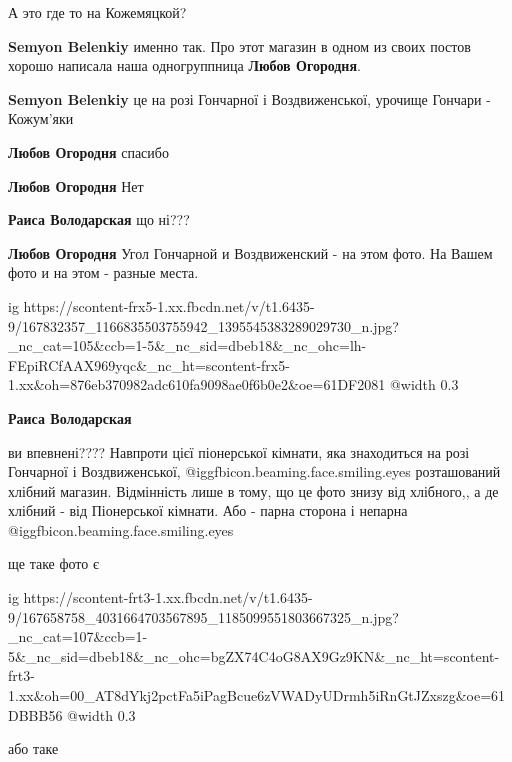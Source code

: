  
 
 
 
 

А это где то на Кожемяцкой?

\textbf{Semyon Belenkiy} именно так. Про этот магазин в одном из своих постов хорошо написала наша одногруппница \textbf{Любов Огородня}.

\textbf{Semyon Belenkiy} це на розі Гончарної і Воздвиженської, урочище Гончари - Кожум'яки

\textbf{Любов Огородня} спасибо

\textbf{Любов Огородня} Нет

\textbf{Раиса Володарская} що ні???

\textbf{Любов Огородня} Угол Гончарной и Воздвиженский - на этом фото. На Вашем фото и на этом - разные места.

\ifcmt
  ig https://scontent-frx5-1.xx.fbcdn.net/v/t1.6435-9/167832357_1166835503755942_1395545383289029730_n.jpg?_nc_cat=105&ccb=1-5&_nc_sid=dbeb18&_nc_ohc=lh-FEpiRCfAAX969yqc&_nc_ht=scontent-frx5-1.xx&oh=876eb370982adc610fa9098ae0f6b0e2&oe=61DF2081
  @width 0.3
\fi

\textbf{Раиса Володарская} 

ви впевнені???? Навпроти цієї піонерської кімнати, яка знаходиться на розі
Гончарної і Воздвиженської,  @igg{fbicon.beaming.face.smiling.eyes}  розташований хлібний магазин. Відмінність лише в
тому, що це фото знизу від хлібного,, а де хлібний - від Піонерської кімнати.
Або - парна сторона і непарна @igg{fbicon.beaming.face.smiling.eyes} 

ще таке фото є

\ifcmt
  ig https://scontent-frt3-1.xx.fbcdn.net/v/t1.6435-9/167658758_4031664703567895_1185099551803667325_n.jpg?_nc_cat=107&ccb=1-5&_nc_sid=dbeb18&_nc_ohc=bgZX74C4oG8AX9Gz9KN&_nc_ht=scontent-frt3-1.xx&oh=00_AT8dYkj2pctFa5iPagBcue6zVWADyUDrmh5iRnGtJZxszg&oe=61DBBB56
  @width 0.3
\fi

або таке

